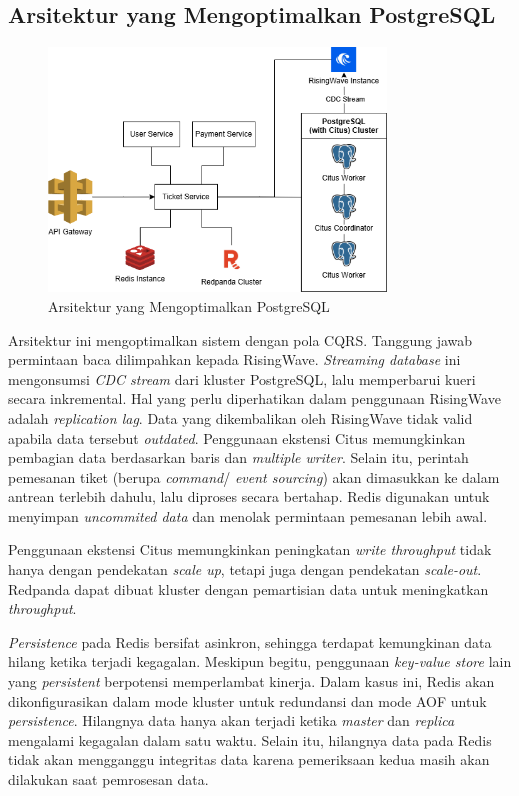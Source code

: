 \subsection{Arsitektur yang Mengoptimalkan PostgreSQL}

\begin{figure}[htbp]
    \centering
    \includegraphics[width=0.8\textwidth]{resources/chapter-3/architecture-optimized.png}
    \caption{Arsitektur yang Mengoptimalkan PostgreSQL}
    \label{fig:optimized-architecture}
\end{figure}

Arsitektur ini mengoptimalkan sistem dengan pola CQRS. Tanggung jawab permintaan baca dilimpahkan kepada RisingWave. \textit{Streaming database} ini mengonsumsi \textit{CDC stream} dari kluster PostgreSQL, lalu memperbarui kueri secara inkremental. Hal yang perlu diperhatikan dalam penggunaan RisingWave adalah \textit{replication lag}. Data yang dikembalikan oleh RisingWave tidak valid apabila data tersebut \textit{outdated}. Penggunaan ekstensi Citus memungkinkan pembagian data berdasarkan baris dan \textit{multiple writer}. Selain itu, perintah pemesanan tiket (berupa \textit{command}/ \textit{event sourcing}) akan dimasukkan ke dalam antrean terlebih dahulu, lalu diproses secara bertahap. Redis digunakan untuk menyimpan \textit{uncommited data} dan menolak permintaan pemesanan lebih awal.

Penggunaan ekstensi Citus memungkinkan peningkatan \textit{write throughput} tidak hanya dengan pendekatan \textit{scale up}, tetapi juga dengan pendekatan \textit{scale-out}. Redpanda dapat dibuat kluster dengan pemartisian data untuk meningkatkan \textit{throughput}.

\textit{Persistence} pada Redis bersifat asinkron, sehingga terdapat kemungkinan data hilang ketika terjadi kegagalan. Meskipun begitu, penggunaan \textit{key-value store} lain yang \textit{persistent} berpotensi memperlambat kinerja. Dalam kasus ini, Redis akan dikonfigurasikan dalam mode kluster untuk redundansi dan mode AOF untuk \textit{persistence}. Hilangnya data hanya akan terjadi ketika \textit{master} dan \textit{replica} mengalami kegagalan dalam satu waktu. Selain itu, hilangnya data pada Redis tidak akan mengganggu integritas data karena pemeriksaan kedua masih akan dilakukan saat pemrosesan data.

